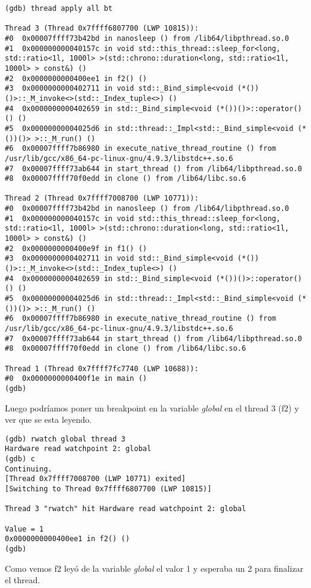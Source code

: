 \begin{verbatim}
(gdb) thread apply all bt

Thread 3 (Thread 0x7ffff6807700 (LWP 10815)):
#0  0x00007ffff73b42bd in nanosleep () from /lib64/libpthread.so.0
#1  0x000000000040157c in void std::this_thread::sleep_for<long, std::ratio<1l, 1000l> >(std::chrono::duration<long, std::ratio<1l, 1000l> > const&) ()
#2  0x0000000000400ee1 in f2() ()
#3  0x0000000000402711 in void std::_Bind_simple<void (*())()>::_M_invoke<>(std::_Index_tuple<>) ()
#4  0x0000000000402659 in std::_Bind_simple<void (*())()>::operator()() ()
#5  0x00000000004025d6 in std::thread::_Impl<std::_Bind_simple<void (*())()> >::_M_run() ()
#6  0x00007ffff7b86980 in execute_native_thread_routine () from /usr/lib/gcc/x86_64-pc-linux-gnu/4.9.3/libstdc++.so.6
#7  0x00007ffff73ab644 in start_thread () from /lib64/libpthread.so.0
#8  0x00007ffff70f0edd in clone () from /lib64/libc.so.6

Thread 2 (Thread 0x7ffff7008700 (LWP 10771)):
#0  0x00007ffff73b42bd in nanosleep () from /lib64/libpthread.so.0
#1  0x000000000040157c in void std::this_thread::sleep_for<long, std::ratio<1l, 1000l> >(std::chrono::duration<long, std::ratio<1l, 1000l> > const&) ()
#2  0x0000000000400e9f in f1() ()
#3  0x0000000000402711 in void std::_Bind_simple<void (*())()>::_M_invoke<>(std::_Index_tuple<>) ()
#4  0x0000000000402659 in std::_Bind_simple<void (*())()>::operator()() ()
#5  0x00000000004025d6 in std::thread::_Impl<std::_Bind_simple<void (*())()> >::_M_run() ()
#6  0x00007ffff7b86980 in execute_native_thread_routine () from /usr/lib/gcc/x86_64-pc-linux-gnu/4.9.3/libstdc++.so.6
#7  0x00007ffff73ab644 in start_thread () from /lib64/libpthread.so.0
#8  0x00007ffff70f0edd in clone () from /lib64/libc.so.6

Thread 1 (Thread 0x7ffff7fc7740 (LWP 10688)):
#0  0x0000000000400f1e in main ()
(gdb)
\end{verbatim}
Luego podríamos poner un breakpoint en la variable \emph{global} en el thread 3 (f2) y ver que se esta leyendo.
\begin{verbatim}
(gdb) rwatch global thread 3
Hardware read watchpoint 2: global
(gdb) c
Continuing.
[Thread 0x7ffff7008700 (LWP 10771) exited]
[Switching to Thread 0x7ffff6807700 (LWP 10815)]

Thread 3 "rwatch" hit Hardware read watchpoint 2: global

Value = 1
0x0000000000400ee1 in f2() ()
(gdb)
\end{verbatim}
Como vemos f2 leyó de la variable \emph{global} el valor 1 y esperaba un 2 para finalizar el thread.\\


